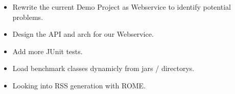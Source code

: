\begin{itemize}
    \item Rewrite the current Demo Project as Webservice to identify potential problems.
    \item Design the API and arch for our Webservice.
    \item Add more JUnit tests.
    \item Load benchmark classes dynamicly from jars / directorys.
    \item Looking into RSS generation with ROME.
\end{itemize}
